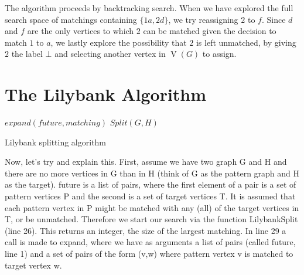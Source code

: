 \documentclass[letterpaper]{article}
\DeclareMathOperator{\V}{V}
\begin{document}
The algorithm proceeds by backtracking search. When we have explored the full
search space of matchings containing $\{1a, 2d\}$, we try reassigning $2$ to
$f$.  Since $d$ and $f$ are the only vertices to which $2$ can be matched given
the decision to match $1$ to $a$, we lastly explore the possibility that $2$ is
left unmatched, by giving $2$ the label $\bot$ and selecting another vertex in
$\V(G)$ to assign.



\section{The Lilybank Algorithm}

\begin{algorithm}
\DontPrintSemicolon
\nl $expand(\mathit{future},matching)$ \;
\nl {}
\;
\nl $Split(G,H)$ \;
\nl {}
\caption{Lilybank splitting algorithm}
\label{jtAlg}
\end{algorithm}

\noindent
Now, let's try and explain this. First, assume we have two graph G and H and there are no more vertices in G than in H (think of G as the pattern graph and H as the target).
future is a list of pairs, where the first element of a pair is a set of pattern vertices P and the second is a set of target vertices T. It is assumed that each pattern vertex in P 
might be matched with any (all) of the target vertices in T, or be unmatched. Therefore we start our search via the function LilybankSplit (line 26). This returns an integer, the size of the largest matching.
In line 29 a call is made to expand, where we have as arguments a list of pairs (called future, line 1) and a set of pairs of the form (v,w) where pattern vertex v is matched to target vertex w.
\end{document}
